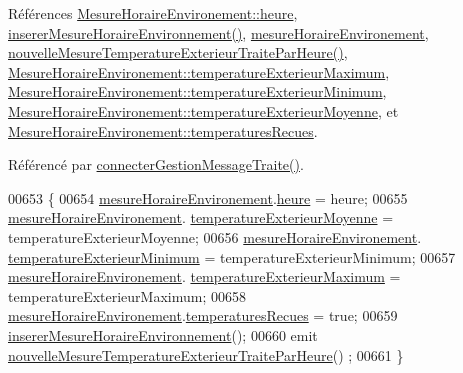 Références \hyperlink{struct_mesure_horaire_environement_a83295c95940d9edae2d082a94f49e1c9}{Mesure\+Horaire\+Environement\+::heure}, \hyperlink{class_ruche_ac52e79446c5629645e02e27d2a01e56c}{inserer\+Mesure\+Horaire\+Environnement()}, \hyperlink{class_ruche_a73a826506110c10d9221065670985e52}{mesure\+Horaire\+Environement}, \hyperlink{class_ruche_ac0d7e104549abdfa87691618aba6291b}{nouvelle\+Mesure\+Temperature\+Exterieur\+Traite\+Par\+Heure()}, \hyperlink{struct_mesure_horaire_environement_aaf73ec5bb5a7c8235c56dc4ea3c4d89c}{Mesure\+Horaire\+Environement\+::temperature\+Exterieur\+Maximum}, \hyperlink{struct_mesure_horaire_environement_ae9737a62128ecf2614901ebe0b118548}{Mesure\+Horaire\+Environement\+::temperature\+Exterieur\+Minimum}, \hyperlink{struct_mesure_horaire_environement_a40be086e9b2454c0e70066a523a1b066}{Mesure\+Horaire\+Environement\+::temperature\+Exterieur\+Moyenne}, et \hyperlink{struct_mesure_horaire_environement_a3444440b836c4893e8d61c3eb5c3e42d}{Mesure\+Horaire\+Environement\+::temperatures\+Recues}.



Référencé par \hyperlink{class_ruche_a20ec8c6dc931218e5cf682050fe845d9}{connecter\+Gestion\+Message\+Traite()}.


\begin{DoxyCode}
00653 \{
00654     \hyperlink{class_ruche_a73a826506110c10d9221065670985e52}{mesureHoraireEnvironement}.\hyperlink{struct_mesure_horaire_environement_a83295c95940d9edae2d082a94f49e1c9}{heure} = heure;
00655     \hyperlink{class_ruche_a73a826506110c10d9221065670985e52}{mesureHoraireEnvironement}.
      \hyperlink{struct_mesure_horaire_environement_a40be086e9b2454c0e70066a523a1b066}{temperatureExterieurMoyenne} = temperatureExterieurMoyenne;
00656     \hyperlink{class_ruche_a73a826506110c10d9221065670985e52}{mesureHoraireEnvironement}.
      \hyperlink{struct_mesure_horaire_environement_ae9737a62128ecf2614901ebe0b118548}{temperatureExterieurMinimum} = temperatureExterieurMinimum;
00657     \hyperlink{class_ruche_a73a826506110c10d9221065670985e52}{mesureHoraireEnvironement}.
      \hyperlink{struct_mesure_horaire_environement_aaf73ec5bb5a7c8235c56dc4ea3c4d89c}{temperatureExterieurMaximum} = temperatureExterieurMaximum;
00658     \hyperlink{class_ruche_a73a826506110c10d9221065670985e52}{mesureHoraireEnvironement}.\hyperlink{struct_mesure_horaire_environement_a3444440b836c4893e8d61c3eb5c3e42d}{temperaturesRecues} = \textcolor{keyword}{true};
00659     \hyperlink{class_ruche_ac52e79446c5629645e02e27d2a01e56c}{insererMesureHoraireEnvironnement}();
00660     emit \hyperlink{class_ruche_ac0d7e104549abdfa87691618aba6291b}{nouvelleMesureTemperatureExterieurTraiteParHeure}()
      ;
00661 \}
\end{DoxyCode}
\mbox{\label{class_ruche_a2d2a681916140b977d45423d0d5d7b34}} 
